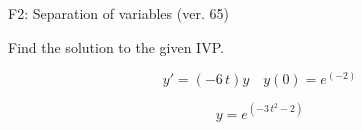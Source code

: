 \begin{exercise}
  \begin{exerciseTitle}F2: Separation of variables (ver. 65)\end{exerciseTitle}
  \begin{exerciseStatement}
    
Find the solution to the given IVP.

    
\[y'=( -6 \, t )y\hspace{1em} y(0)= e^{\left(-2\right)}\]

  \end{exerciseStatement}
  \begin{exerciseAnswer}
    
\[y= e^{\left(-3 \, t^{2} - 2\right)}\]

  \end{exerciseAnswer}
\end{exercise}